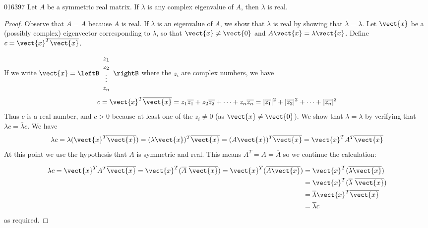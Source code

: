 \begin{theorem}{}{016397} %
Let $A$ be a symmetric real matrix. If $\lambda$ is any complex eigenvalue of $A$, then $\lambda$ is real.\footnotemark 
\end{theorem}

\begin{proof}
Observe that $\overline{A} = A$ because $A$ is real. If $\lambda$ is an eigenvalue of $A$, we show that $\lambda$ is real by showing that $\overline{\lambda} = \lambda$.
 Let $\vect{x}$ be a (possibly complex) eigenvector corresponding to $\lambda$, so that $\vect{x} \neq \vect{0}$ and $A\vect{x} = \lambda\vect{x}$. Define $c = \vect{x}^T\overline{\vect{x}}$.

If we write $\vect{x} = \leftB \begin{array}{c} 
z_1 \\
z_2 \\
\vdots \\
z_n 
\end{array}\rightB$  where the $z_{i}$ are complex numbers, we have
\begin{equation*}
c = \vect{x}^T\overline{\vect{x}} = z_1\overline{z_1} + z_2\overline{z_2} + \dotsb + z_n\overline{z_n} = |\overline{z_1}|^2 + |\overline{z_2}|^2 + \dotsb + |\overline{z_n}|^2
\end{equation*} 
Thus $c$ is a real number, and $c > 0$ because at least one of the $z_{i} \neq 0$ (as $\vect{x} \neq \vect{0}$). We show that $\overline{\lambda} = \lambda$ by verifying that $\lambda c = \overline{\lambda}c$. We have
\begin{equation*}
\lambda c = \lambda(\vect{x}^T\overline{\vect{x}}) = (\lambda \vect{x})^T\overline{\vect{x}} = (A\vect{x})^T\overline{\vect{x}} = \vect{x}^TA^T\overline{\vect{x}}
\end{equation*}
At this point we use the hypothesis that $A$ is symmetric and real. This means $A^T = A = \overline{A}$ so we continue the calculation:



\begin{align*}
\lambda c = \vect{x}^TA^T\overline{\vect{x}} = \vect{x}^T(\overline{A}\ \overline{\vect{x}}) = \vect{x}^T(\overline{A\vect{x}}) &= \vect{x}^T(\overline{\lambda \vect{x}}) \\
&= \vect{x}^T(\overline{\lambda}\ \overline{\vect{x}}) \\
&= \overline{\lambda}\vect{x}^T\overline{\vect{x}} \\
&= \overline{\lambda}c
\end{align*}
as required.
\end{proof}


